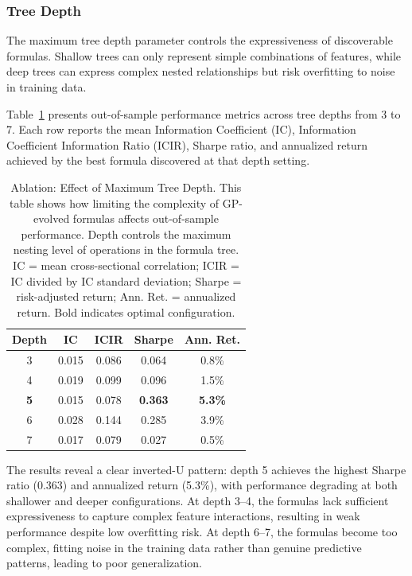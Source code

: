 \documentclass{ieeeaccess}
\begin{document}
\subsubsection{Tree Depth}

The maximum tree depth parameter controls the expressiveness of discoverable formulas. Shallow trees can only represent simple combinations of features, while deep trees can express complex nested relationships but risk overfitting to noise in training data.

Table~\ref{tab:ablation_depth} presents out-of-sample performance metrics across tree depths from 3 to 7. Each row reports the mean Information Coefficient (IC), Information Coefficient Information Ratio (ICIR), Sharpe ratio, and annualized return achieved by the best formula discovered at that depth setting.

\begin{table}[!htbp]
\centering
\caption{Ablation: Effect of Maximum Tree Depth. This table shows how limiting the complexity of GP-evolved formulas affects out-of-sample performance. Depth controls the maximum nesting level of operations in the formula tree. IC = mean cross-sectional correlation; ICIR = IC divided by IC standard deviation; Sharpe = risk-adjusted return; Ann. Ret. = annualized return. Bold indicates optimal configuration.}
\label{tab:ablation_depth}
\begin{tabular}{ccccc}
\toprule
\textbf{Depth} & \textbf{IC} & \textbf{ICIR} & \textbf{Sharpe} & \textbf{Ann. Ret.} \\
\midrule
3 & 0.015 & 0.086 & 0.064 & 0.8\% \\
4 & 0.019 & 0.099 & 0.096 & 1.5\% \\
\textbf{5} & 0.015 & 0.078 & \textbf{0.363} & \textbf{5.3\%} \\
6 & 0.028 & 0.144 & 0.285 & 3.9\% \\
7 & 0.017 & 0.079 & 0.027 & 0.5\% \\
\bottomrule
\end{tabular}
\end{table}

The results reveal a clear inverted-U pattern: depth 5 achieves the highest Sharpe ratio (0.363) and annualized return (5.3\%), with performance degrading at both shallower and deeper configurations. At depth 3--4, the formulas lack sufficient expressiveness to capture complex feature interactions, resulting in weak performance despite low overfitting risk. At depth 6--7, the formulas become too complex, fitting noise in the training data rather than genuine predictive patterns, leading to poor generalization.
\end{document}
